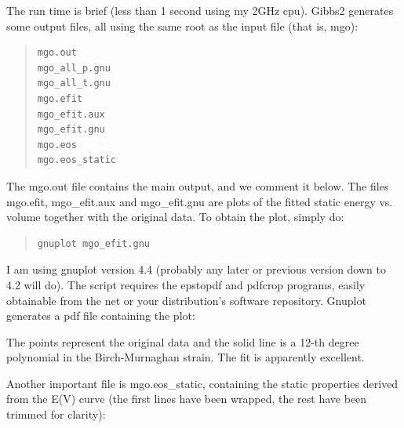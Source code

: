 \documentclass[a4paper]{article}
\begin{document}
The run time is brief (less than 1 second using my 2GHz cpu). Gibbs2
generates some output files, all using the same root as the input file
(that is, mgo):

\begin{quote}
\begin{verbatim}
mgo.out
mgo_all_p.gnu
mgo_all_t.gnu
mgo.efit
mgo_efit.aux
mgo_efit.gnu
mgo.eos
mgo.eos_static
\end{verbatim}
\end{quote}

The mgo.out file contains the main output, and we comment it
below. The files mgo.efit, mgo\_efit.aux and mgo\_efit.gnu are plots of
the fitted static energy vs. volume together with the original
data. To obtain the plot, simply do:

\begin{quote}
\begin{verbatim}
gnuplot mgo_efit.gnu
\end{verbatim}
\end{quote}

I am using gnuplot version 4.4 (probably any later or previous version
down to 4.2 will do). The script requires the epstopdf and pdfcrop
programs, easily obtainable from the net or your distribution's
software repository. Gnuplot generates a pdf file containing the plot:

\noindent{}

The points represent the original data and the solid line is a 12-th
degree polynomial in the Birch-Murnaghan strain. The fit is apparently
excellent.

Another important file is mgo.eos\_static, containing the static
properties derived from the E(V) curve (the first lines have been
wrapped, the rest have been trimmed for clarity):
\end{document}
